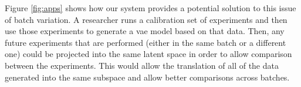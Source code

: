 Figure \ref{fig:apps} shows how our system provides a potential solution to this issue of batch variation.
A researcher runs a calibration set of experiments and then use those experiments to generate a \gls{vae} model based on that data.
Then, any future experiments that are performed (either in the same batch or a different one) could be projected into the same latent space in order to allow comparison between the experiments.
This would allow the translation of all of the data generated into the same subspace and allow better comparisons across batches.

